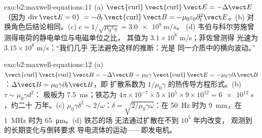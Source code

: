 \begin{solution}{exo:b2:maxwell-equations:11}
(a) $\operatorname{\vect{curl}}\operatorname{\vect{curl}}\vect E = -\Delta\vect E$（因为 $\operatorname{div}
\vect E = 0$）$= -\partial_t\operatorname{\vect{curl}}\vect B = -\mu_0\varepsilon_0\partial_t^2\vect E$。(b)
对换角色后结论相同。(c) $c = 1/\sqrt{\mu_0\varepsilon_0} = \qty{3.0e8}{m/s}$。
(d) 韦伯与科尔劳施曾测得电荷的静电单位与电磁单位之比，
其值为 $3.1 \times 10^8$ m/s；菲佐曾测得
光速为 $3.15 \times 10^8$ m/s：“我们几乎
无法避免这样的推断：光是
同一介质中的横向波动。”
\end{solution}

\begin{solution}{exo:b2:maxwell-equations:12}
(a) $\operatorname{\vect{curl}}\operatorname{\vect{curl}}\vect B = -\Delta\vect B = \mu_0\gamma\operatorname{\vect{curl}}
\vect E = -\mu_0\gamma\partial_t\vect B$：$\Delta\vect B = \mu_0\gamma\partial_t\vect B$，即
扩散系数为 $1/\mu_0\gamma$ 的热传导方程形式。(b) $\tau \sim \mu_0\gamma d^2$：
极板为 \qty{7.5}{ms}；铁芯为 $4\pi \times 10^{-7} \times 5 \times 10^5 \times 9 \times 10^{12} = \qty{6e12}{s}$，约二十
万年。(c) $\mu_0\gamma\delta^2 \sim 2/\omega$：$\delta = \sqrt{2/\mu_0
\gamma\omega}$：在 \qty{50}{Hz} 时为 \qty{9}{mm}，在 \qty{1}{MHz} 时为 \qty{65}{\micro m}。(d) 铁芯的场
无法通过扩散在不到 $10^5$ 年内改变，
观测到的长期变化与倒转要求
导电流体的运动——即发电机。
\end{solution}

